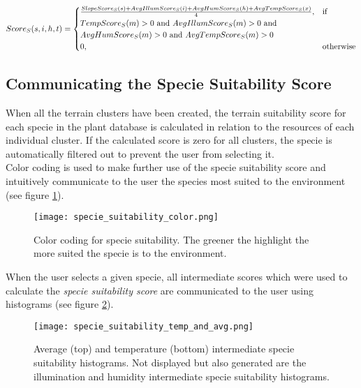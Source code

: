 \begin{equation}
\begin{split}
\centering
Score_{S}(s,i,h,t) = 
\begin{cases}
	\frac{SlopeScore_{S}(s) + AvgIllumScore_{S}(i) + AvgHumScore_{S}(h) + AvgTempScore_{S}(x)}{4}, & \text{if } \\ TempScore_{S}(m) > 0 \text{ and } AvgIllumScore_{S}(m) > 0 \text{ and } \\ AvgHumScore_{S}(m) > 0 \text{ and } AvgTempScore_{S}(m) > 0 \\
    0,              & \text{otherwise}
\end{cases}
\end{split}
\label{eq:specie_suitability_score}
\end{equation}

\subsection{Communicating the Specie Suitability Score}

When all the terrain clusters have been created, the terrain suitability score for each specie in the plant database is calculated in relation to the resources of each individual cluster. If the calculated score is zero for all clusters, the specie is automatically filtered out to prevent the user from selecting it. \\

Color coding is used to make further use of the specie suitability score and intuitively communicate to the user the species most suited to the environment (see figure \ref{fig:specie_color_coding}).

\begin{figure}
\center
	\texttt{[image: specie\_suitability\_color.png]}
	\caption{ Color coding for specie suitability. The greener the highlight the more suited the specie is to the environment.}	
	\label{fig:specie_color_coding}
\end{figure}

When the user selects a given specie, all intermediate scores which were used to calculate the \textit{specie suitability score} are communicated to the user using histograms (see figure \ref{fig:specie_intermediate_suitability_scores}).

\begin{figure}
\center
	\texttt{[image: specie\_suitability\_temp\_and\_avg.png]}
	\caption{ Average (top) and temperature (bottom) intermediate specie suitability histograms. Not displayed but also generated are the illumination and humidity intermediate specie suitability histograms.}	
	\label{fig:specie_intermediate_suitability_scores}
\end{figure}


